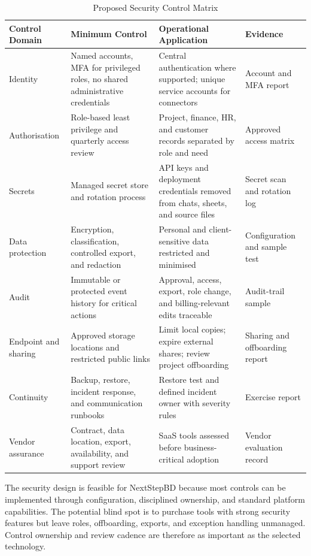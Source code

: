 \documentclass[12pt,a4paper]{report}
\begin{document}
\begin{table}[H]
\centering
\caption{Proposed Security Control Matrix}
\label{tab:security-control-matrix}
\scriptsize
\renewcommand{\arraystretch}{1.15}
\begin{tabularx}{\textwidth}{>{\raggedright\arraybackslash}p{2.4cm}
                                >{\raggedright\arraybackslash}p{3.3cm}
                                >{\raggedright\arraybackslash}X
                                >{\raggedright\arraybackslash}p{2.7cm}}
\toprule
\textbf{Control Domain} & \textbf{Minimum Control} & \textbf{Operational Application} & \textbf{Evidence} \\
\midrule
Identity & Named accounts, MFA for privileged roles, no shared administrative credentials & Central authentication where supported; unique service accounts for connectors & Account and MFA report \\
Authorisation & Role-based least privilege and quarterly access review & Project, finance, HR, and customer records separated by role and need & Approved access matrix \\
Secrets & Managed secret store and rotation process & API keys and deployment credentials removed from chats, sheets, and source files & Secret scan and rotation log \\
Data protection & Encryption, classification, controlled export, and redaction & Personal and client-sensitive data restricted and minimised & Configuration and sample test \\
Audit & Immutable or protected event history for critical actions & Approval, access, export, role change, and billing-relevant edits traceable & Audit-trail sample \\
Endpoint and sharing & Approved storage locations and restricted public links & Limit local copies; expire external shares; review project offboarding & Sharing and offboarding report \\
Continuity & Backup, restore, incident response, and communication runbooks & Restore test and defined incident owner with severity rules & Exercise report \\
Vendor assurance & Contract, data location, export, availability, and support review & SaaS tools assessed before business-critical adoption & Vendor evaluation record \\
\bottomrule
\end{tabularx}
\end{table}

The security design is feasible for NextStepBD because most controls can be implemented through
configuration, disciplined ownership, and standard platform capabilities. The potential blind spot is
to purchase tools with strong security features but leave roles, offboarding, exports, and exception
handling unmanaged. Control ownership and review cadence are therefore as important as the
selected technology.
\end{document}
